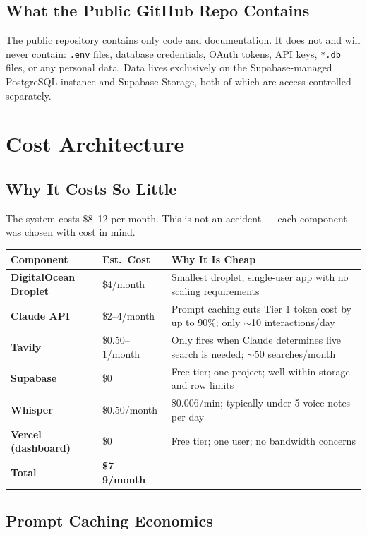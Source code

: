 \documentclass[12pt, a4paper]{article}
\begin{document}
\subsection{What the Public GitHub Repo Contains}

The public repository contains only code and documentation. It does not and will never contain: \texttt{.env} files, database credentials, OAuth tokens, API keys, \texttt{*.db} files, or any personal data. Data lives exclusively on the Supabase-managed PostgreSQL instance and Supabase Storage, both of which are access-controlled separately.

\section{Cost Architecture}

\subsection{Why It Costs So Little}

The system costs \$8--12 per month. This is not an accident --- each component was chosen with cost in mind.

\begin{longtable}{>{\bfseries}p{4.5cm} p{2.5cm} p{7cm}}
\toprule
Component & Est.\ Cost & Why It Is Cheap \\
\midrule
DigitalOcean Droplet & \$4/month & Smallest droplet; single-user app with no scaling requirements \\
\addlinespace
Claude API & \$2--4/month & Prompt caching cuts Tier 1 token cost by up to 90\%; only $\sim$10 interactions/day \\
\addlinespace
Tavily & \$0.50--1/month & Only fires when Claude determines live search is needed; $\sim$50 searches/month \\
\addlinespace
Supabase & \$0 & Free tier; one project; well within storage and row limits \\
\addlinespace
Whisper & \$0.50/month & \$0.006/min; typically under 5 voice notes per day \\
\addlinespace
Vercel (dashboard) & \$0 & Free tier; one user; no bandwidth concerns \\
\midrule
\textbf{Total} & \textbf{\$7--9/month} & \\
\bottomrule
\end{longtable}

\subsection{Prompt Caching Economics}
\end{document}
